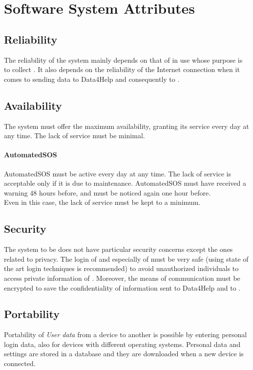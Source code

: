 \documentclass[../../rasd.tex]{subfiles}
\begin{document}
\section{Software System Attributes}
			
			\subsection{Reliability}
			The reliability of the system mainly depends on that of  in use whose purpose is to collect . It also depends on the reliability of the Internet connection when it comes to sending data to Data4Help and consequently to .
			\subsection{Availability}
			The system must offer the maximum availability, granting its service every day at any time. The lack of service must be minimal.
				\paragraph{AutomatedSOS}
				AutomatedSOS must be active every day at any time. The lack of service is acceptable only if it is due to maintenance. AutomatedSOS  must have received a warning 48 hours before, and must be noticed again one hour before. \\
				Even in this case, the lack of service must be kept to a minimum.

			\subsection{Security}
			The system to be does not have particular security concerns except the ones related to privacy. The login of  and especially of  must be very safe (using state of the art login techniques is recommended) to avoid unauthorized individuals to access private information of . Moreover, the means of communication must be encrypted to save the confidentiality of information sent to Data4Help and to .
			
			\subsection{Portability}
			Portability of \textit{User data} from a device to another is possible by entering personal login data, also for devices with different operating systems.
			Personal data and settings are stored in a database and they are downloaded when a new device is connected.
\end{document}
